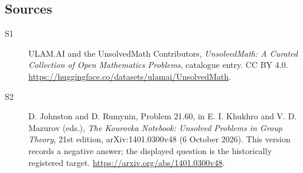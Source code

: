 \documentclass[11pt]{article}
\begin{document}
\subsection{Sources}
\begin{description}
\item[\hypertarget{source:statement:1}{S1}] ULAM.AI and the UnsolvedMath Contributors, \emph{UnsolvedMath: A Curated Collection of Open Mathematics Problems}, catalogue entry. CC BY 4.0. \url{https://huggingface.co/datasets/ulamai/UnsolvedMath}.
\item[\hypertarget{source:statement:2}{S2}] D. Johnston and D. Rumynin, Problem 21.60, in E. I. Khukhro and V. D. Mazurov (eds.), \emph{The Kourovka Notebook: Unsolved Problems in Group Theory}, 21st edition, arXiv:1401.0300v48 (6 October 2026). This version records a negative answer; the displayed question is the historically registered target. \url{https://arxiv.org/abs/1401.0300v48}.
\end{description}
\label{end:statement}
\end{document}

